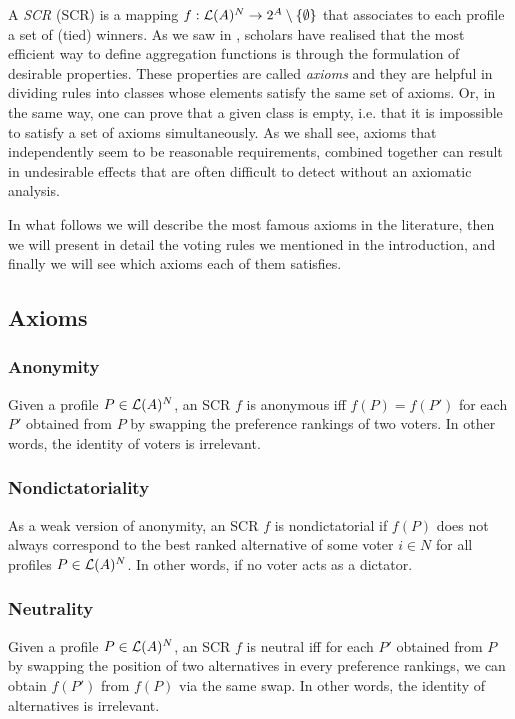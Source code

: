 A \emph{\acl{SCR}} (\acs{SCR}) is a mapping $f:\mathcal{L}(A)^{N}\rightarrow 2^{A} \setminus \{\emptyset \}$ that associates to each profile a set of (tied) winners.
As we saw in , scholars have realised that the most efficient way to define aggregation functions is through the formulation of desirable properties.
These properties are called \textit{axioms} and they are helpful in dividing rules into classes whose elements satisfy the same set of axioms.
Or, in the same way, one can prove that a given class is empty, i.e. that it is impossible to satisfy a set of axioms simultaneously.
As we shall see, axioms that independently seem to be reasonable requirements, combined together can result in undesirable effects that are often difficult to detect without an axiomatic analysis.

In what follows we will describe the most famous axioms in the literature, then we will present in detail the voting rules we mentioned in the introduction, and finally we will see which axioms each of them satisfies.

\subsection{Axioms}

	\subsubsection{Anonymity}
	\vspace{-0.6em}
	Given a profile $P\in\mathcal{L}(A)^{N}$, an \acs{SCR} $f$ is anonymous iff $f(P)=f(P')$ for each $P'$ obtained from $P$ by swapping the preference rankings of two voters. In other words, the identity of voters is irrelevant.
	
	\subsubsection{Nondictatoriality}
	\vspace{-0.6em}
	As a weak version of anonymity, an \acs{SCR} $f$ is nondictatorial if $f(P)$ does not always correspond to the best ranked alternative of some voter $i \in N$ for all profiles $P\in\mathcal{L}(A)^{N}$. In other words, if no voter acts as a dictator.
		
	\subsubsection{Neutrality}
	\vspace{-0.6em}
	Given a profile $P\in\mathcal{L}(A)^{N}$, an \acs{SCR} $f$ is neutral iff for each $P'$ obtained from $P$ by swapping the position of two alternatives in every preference rankings, we can obtain $f(P')$ from $f(P)$ via the same swap. In other words, the identity of alternatives is irrelevant.
	
